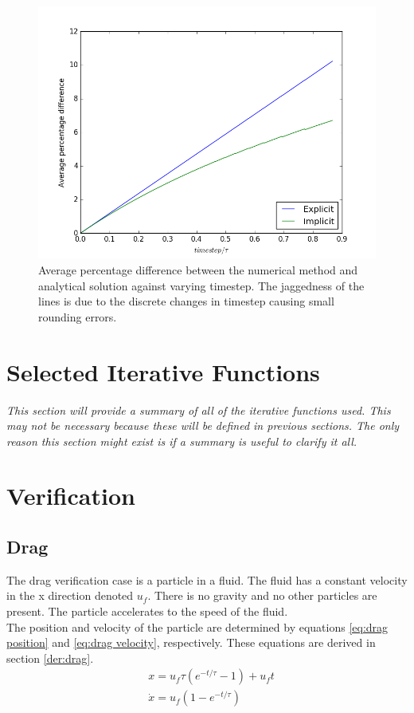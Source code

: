 \documentclass[10pt,a4paper,titlepage]{report}
\begin{document}
\begin{figure}[!htb]
\centering
\includegraphics[scale=0.6]{figures/AveragePercentageDifferenceAgainstTimestep.png}
\caption{Average percentage difference between the numerical method and analytical solution against varying timestep. The jaggedness of the lines is due to the discrete changes in timestep causing small rounding errors.}
\label{fig:avg_percent_diff_against_timestep}
\end{figure}

\section{Selected Iterative Functions}
\textit{This section will provide a summary of all of the iterative functions used. This may not be necessary because these will be defined in previous sections. The only reason this section might exist is if a summary is useful to clarify it all.}
\section{Verification}
\label{sec:verification}
\subsection{Drag}
The drag verification case is a particle in a fluid. The fluid has a constant velocity in the x direction denoted $u_f$. There is no gravity and no other particles are present. The particle accelerates to the speed of the fluid.
\\The position and velocity of the particle are determined by equations \ref{eq:drag position} and \ref{eq:drag velocity}, respectively. These equations are derived in section \ref{der:drag}.
\begin{align}
&x = u_f \tau (e^{-t/\tau} - 1) + u_f t \label{eq:drag position} \\
&\dot{x} = u_f (1 - e^{-t/\tau}) \label{eq:drag velocity} \\
\end{align}
\end{document}
